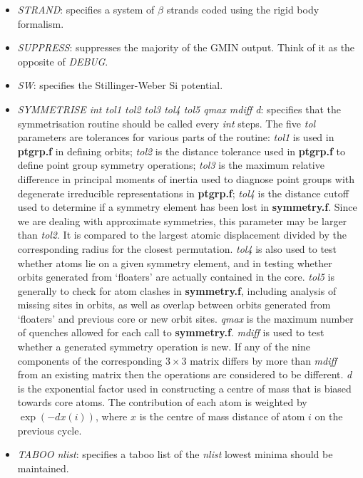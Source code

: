 \documentclass[12pt,a4paper,dvips]{article}
\begin{document}
\begin{itemize}
\item {\it STRAND}: specifies a system of $\beta$ strands coded using the rigid body formalism.

\item {\it SUPPRESS}: suppresses the majority of the GMIN output.
Think of it as the opposite of {\it DEBUG}.

\item {\it SW\/}: specifies the Stillinger-Weber Si potential.

\item {\it SYMMETRISE int tol1 tol2 tol3 tol4 tol5 qmax mdiff d}: specifies that the symmetrisation
routine should be called every {\it int} steps. The five {\it tol} parameters are tolerances
for various parts of the routine: 
{\it tol1} is used in {\bf ptgrp.f} in defining orbits; 
{\it tol2} is the distance tolerance used in {\bf ptgrp.f} to define point group symmetry operations;
{\it tol3} is the maximum relative difference in principal moments of inertia used to
diagnose point groups with degenerate irreducible representations in {\bf ptgrp.f};
{\it tol4} is the distance cutoff used to determine if a symmetry element has been lost in {\bf symmetry.f}.
Since we are dealing with approximate symmetries, this parameter may be larger than {\it tol2}.
It is compared to the largest atomic displacement divided by the corresponding radius
for the closest permutation.
{\it tol4} is also used to test whether atoms lie on a given symmetry element, and in testing 
whether orbits generated from `floaters' are actually contained in the core.
{\it tol5} is generally to check for atom clashes in {\bf symmetry.f}, including analysis of
missing sites in orbits, as well as overlap between orbits generated from `floaters' and
previous core or new orbit sites.
{\it qmax} is the maximum number of quenches allowed for each call to {\bf symmetry.f}.
{\it mdiff} is used to test whether a generated symmetry operation is new. If any of the nine
components of the corresponding $3\times3$ matrix differs by more than {\it mdiff} from an
existing matrix then the operations are considered to be different.
{\it d} is the exponential factor used in constructing a centre of mass that is biased towards
core atoms. The contribution of each atom is weighted by $\exp(-dx(i))$, where $x$ is the 
centre of mass distance of atom $i$ on the previous cycle.

\item {\it TABOO nlist\/}: specifies a taboo list of the {\it nlist\/} lowest minima should be maintained.


\end{itemize}
\end{document}
